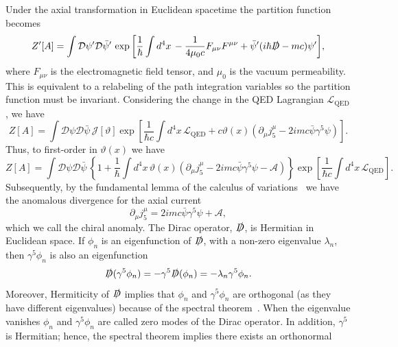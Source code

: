 \documentclass[11pt, a4paper]{article}
\begin{document}
Under the axial transformation in Euclidean spacetime the partition function becomes
\begin{equation}
  Z'[A] = \int{\mathcal{D}\psi'\mathcal{D}\bar{\psi}'\,
  \exp{\left[ \frac{1}{\hbar} \int{d^4x\, -\frac{1}{4\mu_0 c}F_{\mu\nu}F^{\mu\nu} +
  \bar{\psi}'(i\hbar\slashed{D} -mc)\psi'} \right]}},
\end{equation}
where $F_{\mu\nu}$ is the electromagnetic field tensor, and $\mu_0$ is the vacuum permeability.
This is equivalent to a relabeling of the path integration variables so the partition
function must be invariant. Considering the change in the QED Lagrangian
$\mathcal{L}_{\mathrm{QED}}$, we have
\begin{equation}
  Z[A] = \int{\mathcal{D}\psi\mathcal{D}\bar{\psi}\,\mathcal{J}[\vartheta]
    \exp{ \left[\frac{1}{\hbar c} \int{d^4x\, \mathcal{L}_{\mathrm{QED}} +
         c \vartheta(x)(\partial_\mu j^\mu_5 - 2imc\bar{\psi}\gamma^5\psi) }  \right] } }.
\end{equation}
Thus, to first-order in $\vartheta(x)$ we have
\begin{equation}
  Z[A] = \int{\mathcal{D}\psi\mathcal{D}\bar{\psi}\, \left\{1 + \frac{1}{\hbar } \int{d^4x\,
     \vartheta(x)(\partial_\mu j^\mu_5 - 2imc\bar{\psi}\gamma^5\psi -\mathcal{A})} \right\}
   \exp{\left[ \frac{1}{\hbar c} \int{d^4x\, \mathcal{L}_{\mathrm{QED}} } \right]}}.
\end{equation}
Subsequently, by the fundamental lemma of the calculus of variations~\cite{calcvar} we have
the anomalous divergence for the axial current
\begin{equation}
  \partial_\mu j^\mu_5 = 2imc\bar{\psi}\gamma^5\psi + \mathcal{A},
\end{equation}
which we call the chiral anomaly.
The Dirac operator, $\slashed{D}$, is Hermitian in Euclidean space.
If $\phi_n$ is an eigenfunction of $\slashed{D}$, with a non-zero eigenvalue $\lambda_n$,
then $\gamma^5\phi_n$ is also an eigenfunction
\begin{equation}
  \slashed{D}(\gamma^5\phi_n) = -\gamma^5\slashed{D}(\phi_n) = -\lambda_n\gamma^5\phi_n.
\end{equation}
Moreover, Hermiticity of $\slashed{D}$ implies that $\phi_n$ and $\gamma^5\phi_n$
are orthogonal (as they have different eigenvalues) because of the
spectral theorem~\cite{Spectral}.
When the eigenvalue vanishes $\phi_n$ and $\gamma^5\phi_n$
are called zero modes of the Dirac operator. In addition, $\gamma^5$ is 
Hermitian; hence, the spectral theorem implies there exists an orthonormal
\end{document}

